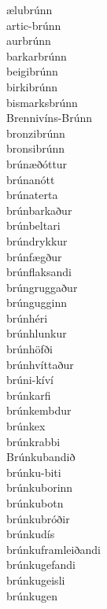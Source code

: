 \documentclass[../samsetningasafn.tex]{subfiles}
\begin{document}
\begin{bigwordlist}
\begin{footnotesize}
\begin{multicols}{4}
	\begin{description}
		\item [ælubrúnn]
		\item [artic-brúnn]
		\item [aurbrúnn]
		\item [barkarbrúnn]
		\item [beigibrúnn]
		\item [birkibrúnn]
		\item [bismarksbrúnn]
		\item [Brennivíns-Brúnn]
		\item [bronzibrúnn]
		\item [bronsibrúnn]
		\item [brúnæðóttur]
		\item [brúnanótt]
		\item [brúnaterta]
		\item [brúnbarkaður]
		\item [brúnbeltari]
		\item [brúndrykkur]
		\item [brúnfægður]
		\item [brúnflaksandi]
		\item [brúngruggaður]
		\item [brúngugginn]
		\item [brúnhéri]
		\item [brúnhlunkur]
		\item [brúnhöfði]
		\item [brúnhvíttaður]
		\item [brúni-kíví]
		\item [brúnkarfi]
		\item [brúnkembdur]
		\item [brúnkex]
		\item [brúnkrabbi]
		\item [Brúnkubandið]
		\item [brúnku-biti]
		\item [brúnkuborinn]
		\item [brúnkubotn]
		\item [brúnkubróðir]
		\item [brúnkudís]
		\item [brúnkuframleiðandi]
		\item [brúnkugefandi]
		\item [brúnkugeisli]
		\item [brúnkugen]

\end{description}
\end{multicols}
\end{footnotesize}
\end{bigwordlist}
\end{document}
